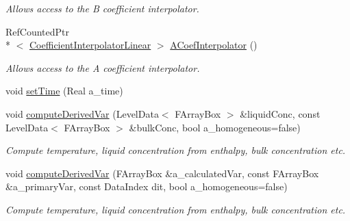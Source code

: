 \begin{DoxyCompactItemize}
\begin{DoxyCompactList}\small\item\em Allows access to the B coefficient interpolator. \end{DoxyCompactList}\item 
\hypertarget{class_a_m_r_non_linear_v_c_op_aefc844d769dd086c3b9a12d59c6132b8}{Ref\-Counted\-Ptr\\*
$<$ \hyperlink{class_coefficient_interpolator_linear}{Coefficient\-Interpolator\-Linear} $>$ \hyperlink{class_a_m_r_non_linear_v_c_op_aefc844d769dd086c3b9a12d59c6132b8}{A\-Coef\-Interpolator} ()}\label{class_a_m_r_non_linear_v_c_op_aefc844d769dd086c3b9a12d59c6132b8}

\begin{DoxyCompactList}\small\item\em Allows access to the A coefficient interpolator. \end{DoxyCompactList}\item 
void \hyperlink{class_a_m_r_non_linear_v_c_op_a55da192e61bf0998503c4af24729266a}{set\-Time} (Real a\-\_\-time)
\item 
\hypertarget{class_a_m_r_non_linear_v_c_op_a15596196a1227672fd35ee1a82007363}{void \hyperlink{class_a_m_r_non_linear_v_c_op_a15596196a1227672fd35ee1a82007363}{compute\-Derived\-Var} (Level\-Data$<$ F\-Array\-Box $>$ \&liquid\-Conc, const Level\-Data$<$ F\-Array\-Box $>$ \&bulk\-Conc, bool a\-\_\-homogeneous=false)}\label{class_a_m_r_non_linear_v_c_op_a15596196a1227672fd35ee1a82007363}

\begin{DoxyCompactList}\small\item\em Compute temperature, liquid concentration from enthalpy, bulk concentration etc. \end{DoxyCompactList}\item 
\hypertarget{class_a_m_r_non_linear_v_c_op_ac8708b04b01443026361b4378cbcefde}{void \hyperlink{class_a_m_r_non_linear_v_c_op_ac8708b04b01443026361b4378cbcefde}{compute\-Derived\-Var} (F\-Array\-Box \&a\-\_\-calculated\-Var, const F\-Array\-Box \&a\-\_\-primary\-Var, const Data\-Index dit, bool a\-\_\-homogeneous=false)}\label{class_a_m_r_non_linear_v_c_op_ac8708b04b01443026361b4378cbcefde}

\begin{DoxyCompactList}\small\item\em Compute temperature, liquid concentration from enthalpy, bulk concentration etc. \end{DoxyCompactList}\end{DoxyCompactItemize}
